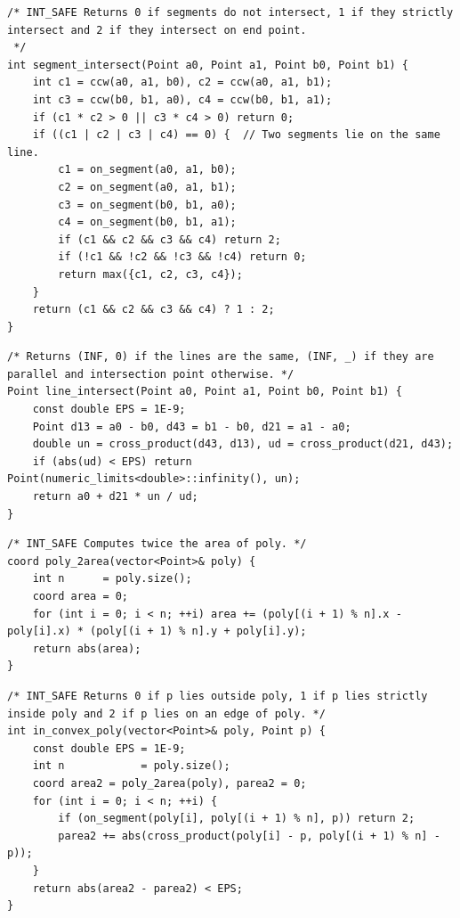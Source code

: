 \documentclass[a4paper,10pt]{article}
\newenvironment{keepfunction}{\begin{samepage}}{\end{samepage}}
\begin{document}
\begin{keepfunction}
\begin{verbatim}
/* INT_SAFE Returns 0 if segments do not intersect, 1 if they strictly intersect and 2 if they intersect on end point.
 */
int segment_intersect(Point a0, Point a1, Point b0, Point b1) {
    int c1 = ccw(a0, a1, b0), c2 = ccw(a0, a1, b1);
    int c3 = ccw(b0, b1, a0), c4 = ccw(b0, b1, a1);
    if (c1 * c2 > 0 || c3 * c4 > 0) return 0;
    if ((c1 | c2 | c3 | c4) == 0) {  // Two segments lie on the same line.
        c1 = on_segment(a0, a1, b0);
        c2 = on_segment(a0, a1, b1);
        c3 = on_segment(b0, b1, a0);
        c4 = on_segment(b0, b1, a1);
        if (c1 && c2 && c3 && c4) return 2;
        if (!c1 && !c2 && !c3 && !c4) return 0;
        return max({c1, c2, c3, c4});
    }
    return (c1 && c2 && c3 && c4) ? 1 : 2;
}
\end{verbatim}
\end{keepfunction}

\begin{keepfunction}
\begin{verbatim}
/* Returns (INF, 0) if the lines are the same, (INF, _) if they are parallel and intersection point otherwise. */
Point line_intersect(Point a0, Point a1, Point b0, Point b1) {
    const double EPS = 1E-9;
    Point d13 = a0 - b0, d43 = b1 - b0, d21 = a1 - a0;
    double un = cross_product(d43, d13), ud = cross_product(d21, d43);
    if (abs(ud) < EPS) return Point(numeric_limits<double>::infinity(), un);
    return a0 + d21 * un / ud;
}
\end{verbatim}
\end{keepfunction}

\begin{keepfunction}
\begin{verbatim}
/* INT_SAFE Computes twice the area of poly. */
coord poly_2area(vector<Point>& poly) {
    int n      = poly.size();
    coord area = 0;
    for (int i = 0; i < n; ++i) area += (poly[(i + 1) % n].x - poly[i].x) * (poly[(i + 1) % n].y + poly[i].y);
    return abs(area);
}
\end{verbatim}
\end{keepfunction}

\begin{keepfunction}
\begin{verbatim}
/* INT_SAFE Returns 0 if p lies outside poly, 1 if p lies strictly inside poly and 2 if p lies on an edge of poly. */
int in_convex_poly(vector<Point>& poly, Point p) {
    const double EPS = 1E-9;
    int n            = poly.size();
    coord area2 = poly_2area(poly), parea2 = 0;
    for (int i = 0; i < n; ++i) {
        if (on_segment(poly[i], poly[(i + 1) % n], p)) return 2;
        parea2 += abs(cross_product(poly[i] - p, poly[(i + 1) % n] - p));
    }
    return abs(area2 - parea2) < EPS;
}
\end{verbatim}
\end{keepfunction}
\end{document}
